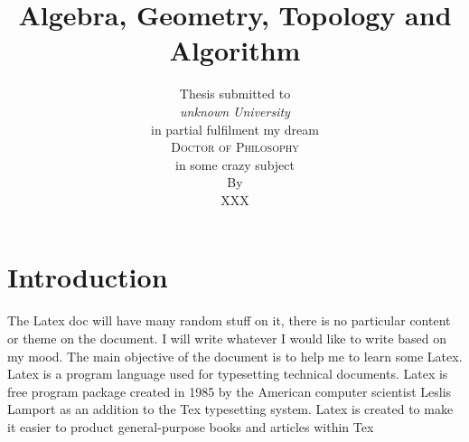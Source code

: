 \documentclass{book}
\begin{document}
\title{\bfseries {\sc\textcolor{title}{Algebra, Geometry, Topology and Algorithm}}}
\author{\textcolor{other}{Thesis  submitted to} \\[5pt]
\emph{\textcolor{other}{unknown University}}\\[2cm]
 \textcolor{other}{in partial fulfilment my dream} \\[2cm]
\textsc{\Large{\textcolor{phd}{Doctor of Philosophy}}} \\[5pt]
  \textcolor{other}{in some crazy subject} \vspace{0.4cm} \\[1in]
  \textcolor{other}{By}\\[5pt] {\Large \sc \textcolor{name}{XXX}}
   \vspace{2cm}
}
\date{}
\maketitle

\section{Introduction}
The Latex doc will have many random stuff on it, there is no particular content or theme on the document.
I will write whatever I would like to write based on my mood. The main objective of the document is to 
help me to learn some Latex. Latex is a program language used for typesetting technical documents. 
Latex is free program package created in 1985 by the American computer scientist Leslis Lamport as an addition
to the Tex typesetting system. Latex is created to make it easier to product general-purpose books and articles within Tex
\end{document}
